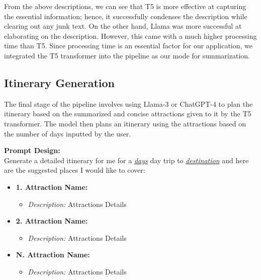 \documentclass[sigconf,authordraft]{acmart}
\begin{document}
From the above descriptions, we can see that T5 is more effective at capturing the essential information; hence, it successfully condenses the description while clearing out any junk text. On the other hand, Llama was more successful at elaborating on the description. However, this came with a much higher processing time than T5. Since processing time is an essential factor for our application, we integrated the T5 transformer into the pipeline as our mode for summarization.

\subsection{Itinerary Generation}
The final stage of the pipeline involves using Llama-3 or ChatGPT-4 to plan the itinerary based on the summarized and concise attractions given to it by the T5 transformer. The model then plans an itinerary using the attractions based on the number of days inputted by the user.

\begin{tcolorbox}[linewidth=1pt, innerleftmargin=15pt, innerrightmargin=15pt, innertopmargin=15pt, innerbottommargin=15pt]
  \textbf{Prompt Design:} \\

  Generate a detailed itinerary for me for a \underline{\textit{days}} day trip to  \underline{\textit{destination}} and here are the suggested places I would like to cover:

  \begin{itemize}
      \item \textbf{1. Attraction Name:}
      \begin{itemize}
          \item \textit{Description:} Attractions Details
      \end{itemize}
      \item \textbf{2. Attraction Name:}
      \begin{itemize}
          \item \textit{Description:} Attractions Details
      \end{itemize}
      \vspace{2\baselineskip} %
      \item \textbf{N. Attraction Name:}
      \begin{itemize}
          \item \textit{Description:} Attractions Details
      \end{itemize}
  \end{itemize}
\end{tcolorbox}
\end{document}
